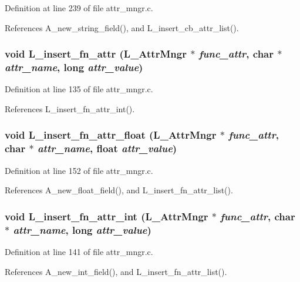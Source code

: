 Definition at line 239 of file attr\_\-mngr.c.

References A\_\-new\_\-string\_\-field(), and L\_\-insert\_\-cb\_\-attr\_\-list().
\subsubsection{\setlength{\rightskip}{0pt plus 5cm}void L\_\-insert\_\-fn\_\-attr (\bf{L\_\-Attr\-Mngr} $\ast$ {\em func\_\-attr}, char $\ast$ {\em attr\_\-name}, long {\em attr\_\-value})}\label{attr__mngr_8h_720fa2501e4cdafc4013cc818bb965bf}




Definition at line 135 of file attr\_\-mngr.c.

References L\_\-insert\_\-fn\_\-attr\_\-int().
\subsubsection{\setlength{\rightskip}{0pt plus 5cm}void L\_\-insert\_\-fn\_\-attr\_\-float (\bf{L\_\-Attr\-Mngr} $\ast$ {\em func\_\-attr}, char $\ast$ {\em attr\_\-name}, float {\em attr\_\-value})}\label{attr__mngr_8h_02959ab51052802c689cd9a10efc9eb3}




Definition at line 152 of file attr\_\-mngr.c.

References A\_\-new\_\-float\_\-field(), and L\_\-insert\_\-fn\_\-attr\_\-list().
\subsubsection{\setlength{\rightskip}{0pt plus 5cm}void L\_\-insert\_\-fn\_\-attr\_\-int (\bf{L\_\-Attr\-Mngr} $\ast$ {\em func\_\-attr}, char $\ast$ {\em attr\_\-name}, long {\em attr\_\-value})}\label{attr__mngr_8h_3b96718bf70ec42e68fa2927f8b2e0ce}




Definition at line 141 of file attr\_\-mngr.c.

References A\_\-new\_\-int\_\-field(), and L\_\-insert\_\-fn\_\-attr\_\-list().


